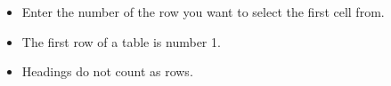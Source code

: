 \begin{itemize}
\item Enter the number of the row you want to select the first cell from.
\item The first row of a table is number 1.
\item Headings do not count as rows. 
\end{itemize}

    
